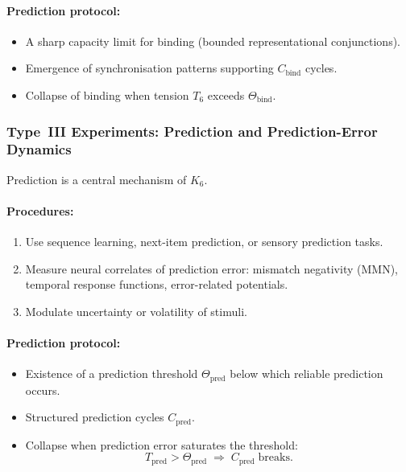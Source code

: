 \paragraph{Prediction protocol:}

\begin{itemize}
    \item A sharp capacity limit for binding 
          (bounded representational conjunctions).
    \item Emergence of synchronisation patterns supporting 
          $C_{\mathrm{bind}}$ cycles.
    \item Collapse of binding when tension $T_6$ exceeds
          $\Theta_{\mathrm{bind}}$.
\end{itemize}



\subsubsection{Type~III Experiments: Prediction and Prediction-Error Dynamics}

Prediction is a central mechanism of $K_6$.

\paragraph{Procedures:}

\begin{enumerate}
    \item Use sequence learning, next-item prediction,
          or sensory prediction tasks.
    \item Measure neural correlates of prediction error:
          mismatch negativity (MMN), temporal response functions,
          error-related potentials.
    \item Modulate uncertainty or volatility of stimuli.
\end{enumerate}

\paragraph{Prediction protocol:}

\begin{itemize}
    \item Existence of a prediction threshold 
          $\Theta_{\mathrm{pred}}$ below which reliable prediction occurs.
    \item Structured prediction cycles $C_{\mathrm{pred}}$.
    \item Collapse when prediction error saturates the threshold:
          \[
             T_{\mathrm{pred}} > \Theta_{\mathrm{pred}}
             \;\Rightarrow\; C_{\mathrm{pred}} \;\text{breaks}.
          \]
\end{itemize}



